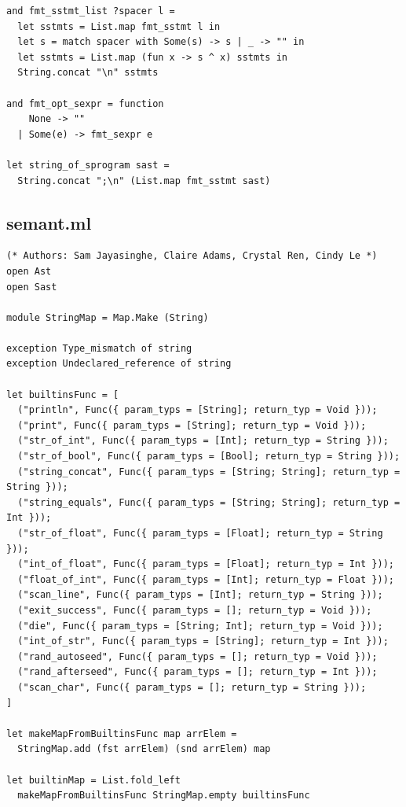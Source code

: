 \documentclass[12pt]{article}
\begin{document}
\begin{mdframed}[hidealllines=true,backgroundcolor=blue!20]
\begin{lstlisting}
and fmt_sstmt_list ?spacer l =
  let sstmts = List.map fmt_sstmt l in
  let s = match spacer with Some(s) -> s | _ -> "" in
  let sstmts = List.map (fun x -> s ^ x) sstmts in
  String.concat "\n" sstmts

and fmt_opt_sexpr = function
    None -> ""
  | Some(e) -> fmt_sexpr e

let string_of_sprogram sast =
  String.concat ";\n" (List.map fmt_sstmt sast)
\end{lstlisting}
\end{mdframed}

\subsection{semant.ml}
\begin{mdframed}[hidealllines=true,backgroundcolor=blue!20]
\begin{lstlisting}
(* Authors: Sam Jayasinghe, Claire Adams, Crystal Ren, Cindy Le *)
open Ast
open Sast

module StringMap = Map.Make (String)

exception Type_mismatch of string
exception Undeclared_reference of string

let builtinsFunc = [
  ("println", Func({ param_typs = [String]; return_typ = Void }));
  ("print", Func({ param_typs = [String]; return_typ = Void }));
  ("str_of_int", Func({ param_typs = [Int]; return_typ = String }));
  ("str_of_bool", Func({ param_typs = [Bool]; return_typ = String }));
  ("string_concat", Func({ param_typs = [String; String]; return_typ = String })); 
  ("string_equals", Func({ param_typs = [String; String]; return_typ = Int })); 
  ("str_of_float", Func({ param_typs = [Float]; return_typ = String })); 
  ("int_of_float", Func({ param_typs = [Float]; return_typ = Int })); 
  ("float_of_int", Func({ param_typs = [Int]; return_typ = Float })); 
  ("scan_line", Func({ param_typs = [Int]; return_typ = String })); 
  ("exit_success", Func({ param_typs = []; return_typ = Void })); 
  ("die", Func({ param_typs = [String; Int]; return_typ = Void })); 
  ("int_of_str", Func({ param_typs = [String]; return_typ = Int })); 
  ("rand_autoseed", Func({ param_typs = []; return_typ = Void }));  
  ("rand_afterseed", Func({ param_typs = []; return_typ = Int }));
  ("scan_char", Func({ param_typs = []; return_typ = String }));
]

let makeMapFromBuiltinsFunc map arrElem = 
  StringMap.add (fst arrElem) (snd arrElem) map

let builtinMap = List.fold_left 
  makeMapFromBuiltinsFunc StringMap.empty builtinsFunc


\end{lstlisting}
\end{mdframed}
\end{document}
